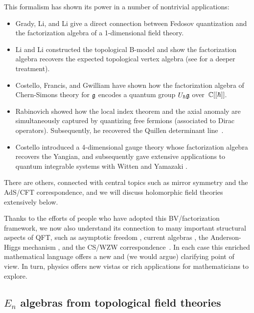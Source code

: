 \documentclass[11pt]{amsart}
\begin{document}
This formalism has shown its power in a number of nontrivial applications:
\begin{itemize}
\item Grady, Li, and Li \cite{GLL} give a direct connection between Fedosov quantization and the factorization algebra of a 1-dimensional field theory.
\item Li and Li \cite{LiLi} constructed the topological B-model and show the factorization algebra recovers the expected topological vertex algebra (see \cite{LiVOA} for a deeper treatment).
\item Costello, Francis, and Gwilliam \cite{CFG} have shown how the factorization algebra of Chern-Simons theory for $\mathfrak g$ encodes a quantum group $U_\hbar \mathfrak g$ over~$\mathbb C[[\hbar]]$.
\item Rabinovich \cite{RabAxial} showed how the local index theorem and the axial anomaly are simultaneously captured by quantizing free fermions (associated to Dirac operators). Subsequently, he recovered the Quillen determinant line~\cite{RabDet}.
\item Costello \cite{CosYangian} introduced a 4-dimensional gauge theory whose factorization algebra recovers the Yangian,
and subsequently gave extensive applications to quantum integrable systems with Witten and Yamazaki \cite{CWY1,CWY2, CY}.
\end{itemize}
There are others, connected with central topics such as mirror symmetry and the AdS/CFT correspondence, 
and we will discuss holomorphic field theories extensively below.

Thanks to the efforts of people who have adopted this BV/factorization framework,
we now also understand its connection to many important structural aspects of QFT, 
such as asymptotic freedom \cite{EWY}, current algebras \cite{GWcurr}, the Anderson-Higgs mechanism \cite{EG}, and the CS/WZW correspondence~\cite{GRW, CosDimGai}.
In each case this enriched mathematical language offers a new and (we would argue) clarifying point of view.
In turn, physics offers new vistas or rich applications for mathematicians to explore.

\subsection{$E_n$ algebras from topological field theories}
\end{document}
